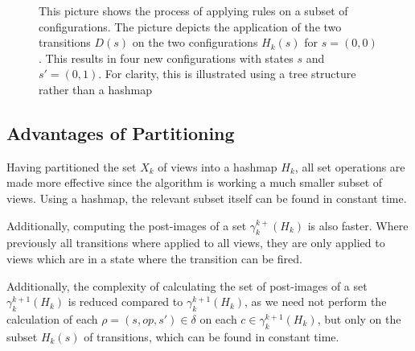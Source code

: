 \begin{figure}
\centering
\def\svgwidth{\columnwidth}

\caption{This picture shows the process of applying rules on a subset of configurations. The picture depicts the application of the two transitions $D(s)$ on the two configurations $H_k(s)$ for $s=(0,0)$. This results in four new configurations with states $s$ and $s' = (0,1)$. For clarity, this is illustrated using a tree structure rather than a hashmap}
\label{applyrule}
\end{figure}



\subsection{Advantages of Partitioning}
Having partitioned the set $X_k$ of views into a hashmap $H_k$, all set operations are made more effective since the algorithm is working a much smaller subset of views. Using a hashmap, the relevant subset itself can be found in constant time.

Additionally, computing the post-images of a set $\gamma_k^{k+}(H_k)$ is also faster. Where previously all transitions where applied to all views, they are only applied to views which are in a state where the transition can be fired.

Additionally, the complexity of calculating the set of post-images of a set $\gamma_k^{k+1}(H_k)$ is reduced compared to $\gamma_k^{k+1}(H_k)$, as we need not perform the calculation of each $\rho = (s, op, s') \in \delta$ on each $c \in \gamma_k^{k+1}(H_k)$, but only on the subset $H_k(s)$ of transitions, which can be found in constant time.


